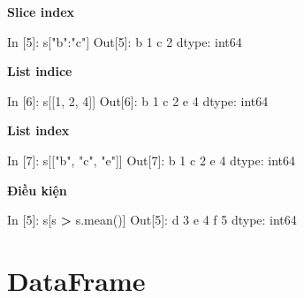 \documentclass[
]{book}
\newenvironment{Shaded}{\begin{snugshade}}{\end{snugshade}}
\newcommand{\DecValTok}[1]{\textcolor[rgb]{0.00,0.00,0.81}{#1}}
\newcommand{\NormalTok}[1]{#1}
\newcommand{\OperatorTok}[1]{\textcolor[rgb]{0.81,0.36,0.00}{\textbf{#1}}}
\newcommand{\StringTok}[1]{\textcolor[rgb]{0.31,0.60,0.02}{#1}}
\begin{document}
\textbf{Slice index}

\begin{Shaded}
\begin{Highlighting}[]
\NormalTok{In [}\DecValTok{5}\NormalTok{]: s[}\StringTok{"b"}\NormalTok{:}\StringTok{"c"}\NormalTok{]}
\NormalTok{Out[}\DecValTok{5}\NormalTok{]: }
\NormalTok{b    }\DecValTok{1}
\NormalTok{c    }\DecValTok{2}
\NormalTok{dtype: int64}
\end{Highlighting}
\end{Shaded}

\textbf{List indice}

\begin{Shaded}
\begin{Highlighting}[]
\NormalTok{In [}\DecValTok{6}\NormalTok{]: s[[}\DecValTok{1}\NormalTok{, }\DecValTok{2}\NormalTok{, }\DecValTok{4}\NormalTok{]]}
\NormalTok{Out[}\DecValTok{6}\NormalTok{]:}
\NormalTok{b    }\DecValTok{1}
\NormalTok{c    }\DecValTok{2}
\NormalTok{e    }\DecValTok{4}
\NormalTok{dtype: int64}
\end{Highlighting}
\end{Shaded}

\textbf{List index}

\begin{Shaded}
\begin{Highlighting}[]
\NormalTok{In [}\DecValTok{7}\NormalTok{]: s[[}\StringTok{"b"}\NormalTok{, }\StringTok{"c"}\NormalTok{, }\StringTok{"e"}\NormalTok{]]}
\NormalTok{Out[}\DecValTok{7}\NormalTok{]:}
\NormalTok{b    }\DecValTok{1}
\NormalTok{c    }\DecValTok{2}
\NormalTok{e    }\DecValTok{4}
\NormalTok{dtype: int64}
\end{Highlighting}
\end{Shaded}

\textbf{Điều kiện}

\begin{Shaded}
\begin{Highlighting}[]
\NormalTok{In [}\DecValTok{5}\NormalTok{]: s[s }\OperatorTok{\textgreater{}}\NormalTok{ s.mean()]}
\NormalTok{Out[}\DecValTok{5}\NormalTok{]:}
\NormalTok{d    }\DecValTok{3}
\NormalTok{e    }\DecValTok{4}
\NormalTok{f    }\DecValTok{5}
\NormalTok{dtype: int64}
\end{Highlighting}
\end{Shaded}

\hypertarget{cach-khoi-tao-data-frame}{%
\section{DataFrame}\label{cach-khoi-tao-data-frame}}
\end{document}
